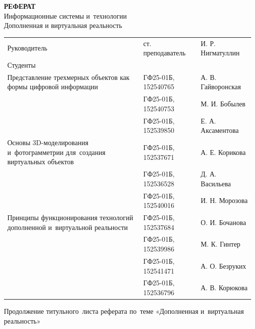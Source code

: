 \documentclass{ou}
\begin{document}
\thispagestyle{empty}
\begin{center}
\shortstack{\FGAVO}\vspace{4\baselineskip}
\textbf{РЕФЕРАТ}\\
Информационные системы и~технологии\\
Дополненная и виртуальная реальность\vspace{2\baselineskip}\end{center}
\begin{flushleft}
\doublespacing
\begin{tabularx}{\textwidth}{@{} p{} l l @{}}
Руководитель & ст. преподаватель & И. Р. Нигматуллин\\
Студенты     &                   &                  \\
\multirow{-2.27}{\hsize}{\singlespacing Представление трехмерных объектов как формы цифровой информации}
             & ГФ25-01Б, 152540765 & А. В. Гайворонская\\
             & ГФ25-01Б, 152540753 & М. И. Бобылев\\
             & ГФ25-01Б, 152539850 & Е. А. Аксаментова\\
\multirow{-2.27}{\hsize}{\singlespacing Основы 3D-моделирования и~фотограмметрии для~создания виртуальных объектов}
             & ГФ25-01Б, 152537671 & А. Е. Корикова\\
             & ГФ25-01Б, 152536528 & Д. А. Васильева\\
             & ГФ25-01Б, 152540016 & И. Н. Морозова\\         
\multirow{-2.27}{\hsize}{\singlespacing Принципы функционирования технологий дополненной и~виртуальной реальности}
             & ГФ25-01Б, 152537684 & О. И. Бочанова\\
             & ГФ25-01Б, 152539986 & М. К. Гинтер\\
             & ГФ25-01Б, 152541471 & А. О. Безруких\\
             & ГФ25-01Б, 152536796 & А. В. Корюкова\\
\end{tabularx}
\end{flushleft}
\vspace*{\fill}
\begin{center}
\city
\end{center}
\newpage
\thispagestyle{empty}
Продолжение титульного~листа реферата по~теме «Дополненная и~виртуальная реальность»
\end{document}
